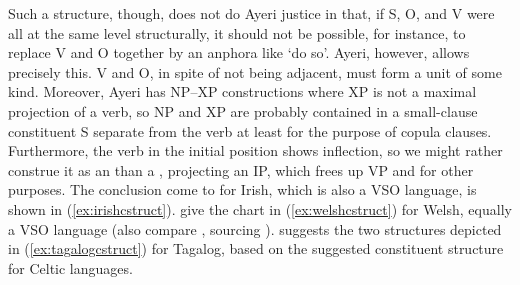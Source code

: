 Such a structure, though, does not do Ayeri justice in that, if S, O, and V
were all at the same level structurally, it should not be possible, for
instance, to replace V and O together by an anphora like `do so'. Ayeri,
however, allows precisely this. V and O, in spite of not being adjacent, must
form a unit of some kind. Moreover, Ayeri has NP--XP constructions where XP is
not a maximal projection of a verb, so NP and XP are probably contained in a
small-clause constituent S separate from the verb at least for the purpose of
copula clauses. Furthermore, the verb in the initial position shows inflection,
so we might rather construe it as an  than a , projecting an
IP, which frees up VP and  for other purposes. The conclusion
\citet{chungmccloskey1987} come to for Irish, which is also a VSO language, is
shown in (\ref{ex:irishcstruct}). \citet{bresnan2016} give the chart in
(\ref{ex:welshcstruct}) for Welsh, equally a VSO language (also compare
\cite[66]{dalrymple2001}, sourcing \cite{sadler1997}). \citet{kroeger1991}
suggests the two structures depicted in (\ref{ex:tagalogcstruct}) for Tagalog,
based on the suggested constituent structure for Celtic languages.

